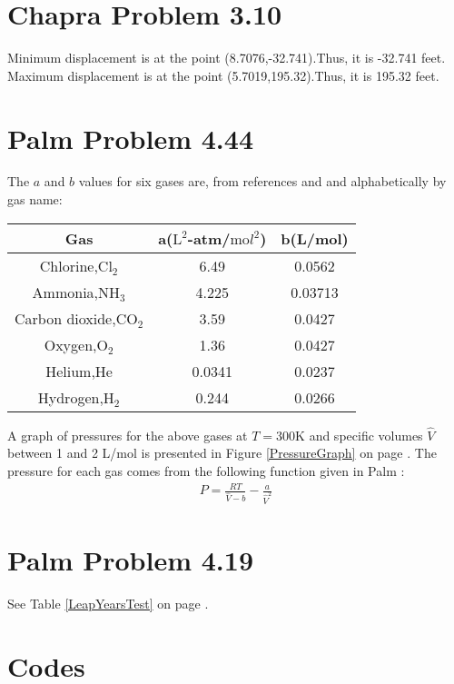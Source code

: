 \documentclass{article}
\begin{document}
\section{Chapra Problem 3.10}
Minimum displacement is at the point (8.7076,-32.741).Thus, it is -32.741 feet. Maximum displacement is at the point (5.7019,195.32).Thus, it is 195.32 feet. 

\section{Palm Problem 4.44}
\renewcommand{\arraystretch}{1.3}
The $a$ and $b$ values for six gases are, from
references \cite{Palm} and \cite{LibreTexts} and alphabetically by gas name:
\begin{center}
\begin{tabular}{ccc}\hline
Gas & a($\mathrm{L}^2$-atm/$\mathrm{mo}l^2$) & b(L/mol)\\\hline
Chlorine,C$\mathrm{l}_2$ & 6.49 & 0.0562\\
Ammonia,N$\mathrm{H}_3$ & 4.225 & 0.03713\\
Carbon dioxide,C$\mathrm{O}_2$ & 3.59 & 0.0427\\
Oxygen,$\mathrm{O}_2$ & 1.36 & 0.0427\\
Helium,He & 0.0341 & 0.0237\\
Hydrogen,$\mathrm{H}_2$ & 0.244 & 0.0266\\\hline
\end{tabular}
\end{center}
A graph of pressures for the above gases at $T=$300K and specific volumes $\hat{V}$ between 1 and 2 L/mol is presented in Figure \ref{PressureGraph} on page
\pageref{PressureGraph}.  The pressure for each gas comes from
the following function given in Palm \cite[p.~215]{Palm}:
\begin{align*}
P=\frac{RT}{\hat{V}-b}-\frac{a}{\hat{V}^2}
\end{align*}

\section{Palm Problem 4.19}
See Table \ref{LeapYearsTest} on page \pageref{LeapYearsTest}.

\pagebreak
\appendix
\section{Codes}
\end{document}
